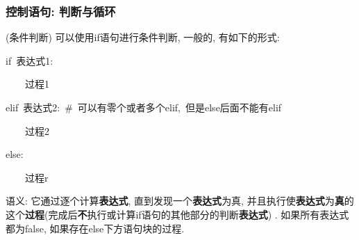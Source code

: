 \subsubsection{控制语句: 判断与循环}
\begin{definition}
(条件判断) 可以使用if语句进行条件判断, 一般的, 有如下的形式:

\noindent\begin{minipage}[t]{1\columnwidth}%
\begin{lyxcode}
if~表达式1:

~~~~过程1

elif~表达式2:~\#~可以有零个或者多个elif,~但是else后面不能有elif

~~~~过程2

else:

~~~~过程r
\end{lyxcode}
%
\end{minipage}
\end{definition}
语义: 它通过逐个计算\textbf{表达式}, 直到发现一个\textbf{表达式}为真, 并且执行使\textbf{表达式}为\textbf{真}的这个\textbf{过程}(完成后\textbf{不}执行或计算if语句的其他部分的判断\textbf{表达式})
. 如果所有表达式都为false, 如果存在else下方语句块的过程.

